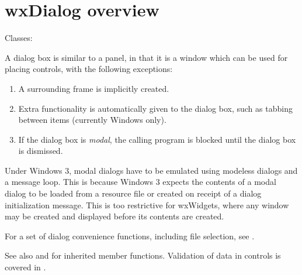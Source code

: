 \section{wxDialog overview}\label{wxdialogoverview}

Classes: 

A dialog box is similar to a panel, in that it is a window which can
be used for placing controls, with the following exceptions:

\begin{enumerate}
\item A surrounding frame is implicitly created.
\item Extra functionality is automatically given to the dialog box,
  such as tabbing between items (currently Windows only).
\item If the dialog box is {\it modal}, the calling program is blocked
  until the dialog box is dismissed.
\end{enumerate}

Under Windows 3, modal dialogs have to be emulated using
modeless dialogs and a message loop. This is because Windows 3 expects
the contents of a modal dialog to be loaded from a resource file or
created on receipt of a dialog initialization message. This is too
restrictive for wxWidgets, where any window may be created and displayed
before its contents are created.

For a set of dialog convenience functions, including file selection, see
\rtfsp{}.

See also  and  for inherited
member functions. Validation of data in controls is covered
in .



